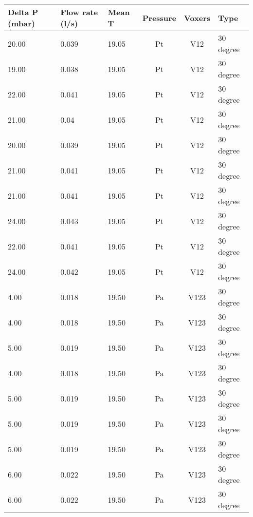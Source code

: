 \begin{table}[t]
\centering
\begin{tabular}{l | l | l | c | c | l}
Delta P (mbar) & Flow rate (l/s) & Mean T & Pressure & Voxers & Type                \\ \hline
20.00          & 0.039           & 19.05  & Pt       & V12    & 30 degree           \\
19.00          & 0.038           & 19.05  & Pt       & V12    & 30 degree           \\
22.00          & 0.041           & 19.05  & Pt       & V12    & 30 degree           \\
21.00          & 0.04            & 19.05  & Pt       & V12    & 30 degree           \\
20.00          & 0.039           & 19.05  & Pt       & V12    & 30 degree           \\
21.00          & 0.041           & 19.05  & Pt       & V12    & 30 degree           \\
21.00          & 0.041           & 19.05  & Pt       & V12    & 30 degree           \\
24.00          & 0.043           & 19.05  & Pt       & V12    & 30 degree           \\
22.00          & 0.041           & 19.05  & Pt       & V12    & 30 degree           \\
24.00          & 0.042           & 19.05  & Pt       & V12    & 30 degree           \\
4.00           & 0.018           & 19.50  & Pa       & V123   & 30 degree           \\
4.00           & 0.018           & 19.50  & Pa       & V123   & 30 degree           \\
5.00           & 0.019           & 19.50  & Pa       & V123   & 30 degree           \\
4.00           & 0.018           & 19.50  & Pa       & V123   & 30 degree           \\
5.00           & 0.019           & 19.50  & Pa       & V123   & 30 degree           \\
5.00           & 0.019           & 19.50  & Pa       & V123   & 30 degree           \\
5.00           & 0.019           & 19.50  & Pa       & V123   & 30 degree           \\
6.00           & 0.022           & 19.50  & Pa       & V123   & 30 degree           \\
6.00           & 0.022           & 19.50  & Pa       & V123   & 30 degree           \\

\end{tabular}
\end{table}
